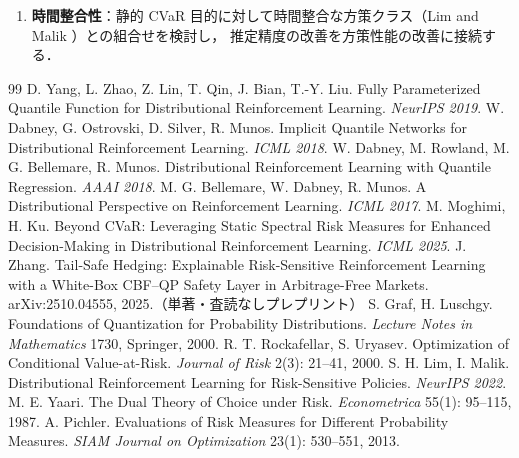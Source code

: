 \documentclass[a4paper,10pt]{jsarticle}
\theoremstyle{definition}
\begin{document}
\begin{enumerate}
  本小規模環境でもクラッシュ規模を位置依存（例：$-5(1+|T_3|)(1+x/3)$）に変更すれば状態依存性を低コストで導入でき，FPN 学習の寄与を数時間規模で先行的に検証できる．
  状態ごとに最適配置が異なる環境（実験C のヘッジ損益）では FPN の状態依存最適化が効くかを検証する．
  実験Bはシード数を 10 以上に拡張して統計的な優位性（bootstrap 信頼区間，paired comparison を含む）を確認するとともに，
  独立な複数評価バッチから参照値の標準誤差を評価する．
  \item \textbf{時間整合性}：静的 CVaR 目的に対して時間整合な方策クラス（Lim and Malik \cite{lim2022distributional}）との組合せを検討し，
  推定精度の改善を方策性能の改善に接続する．
\end{enumerate}
\begin{thebibliography}{99}
\footnotesize
{} D. Yang, L. Zhao, Z. Lin, T. Qin, J. Bian, T.-Y. Liu.
Fully Parameterized Quantile Function for Distributional Reinforcement Learning. \textit{NeurIPS 2019}.
 W. Dabney, G. Ostrovski, D. Silver, R. Munos.
Implicit Quantile Networks for Distributional Reinforcement Learning. \textit{ICML 2018}.
 W. Dabney, M. Rowland, M. G. Bellemare, R. Munos.
Distributional Reinforcement Learning with Quantile Regression. \textit{AAAI 2018}.
 M. G. Bellemare, W. Dabney, R. Munos.
A Distributional Perspective on Reinforcement Learning. \textit{ICML 2017}.
 M. Moghimi, H. Ku.
Beyond CVaR: Leveraging Static Spectral Risk Measures for Enhanced Decision-Making in Distributional Reinforcement Learning. \textit{ICML 2025}.
 J. Zhang.
Tail-Safe Hedging: Explainable Risk-Sensitive Reinforcement Learning with a White-Box CBF--QP Safety Layer in Arbitrage-Free Markets.
arXiv:2510.04555, 2025.（単著・査読なしプレプリント）
 S. Graf, H. Luschgy.
Foundations of Quantization for Probability Distributions. \textit{Lecture Notes in Mathematics} 1730, Springer, 2000.
 R. T. Rockafellar, S. Uryasev.
Optimization of Conditional Value-at-Risk. \textit{Journal of Risk} 2(3): 21--41, 2000.
 S. H. Lim, I. Malik.
Distributional Reinforcement Learning for Risk-Sensitive Policies. \textit{NeurIPS 2022}.
 M. E. Yaari.
The Dual Theory of Choice under Risk. \textit{Econometrica} 55(1): 95--115, 1987.
 A. Pichler.
Evaluations of Risk Measures for Different Probability Measures. \textit{SIAM Journal on Optimization} 23(1): 530--551, 2013.

\end{thebibliography}
\end{document}
